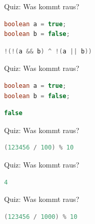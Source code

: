 \documentclass[18pt]{beamer}
\begin{document}
\begin{frame}[fragile]{Quiz: Was kommt raus?}
    \begin{lstlisting}[language=Java]
boolean a = true;
boolean b = false;
    \end{lstlisting}
    \begin{exampleblock}{}
        \begin{lstlisting}[language=Java]
!(!(a && b) ^ !(a || b))
        \end{lstlisting}
    \end{exampleblock}
\end{frame}

\begin{frame}[fragile]{Quiz: Was kommt raus?}
    \begin{lstlisting}[language=Java]
boolean a = true;
boolean b = false;
    \end{lstlisting}
    \begin{block}{}
        \begin{lstlisting}[language=Java]
false
        \end{lstlisting}
    \end{block}
\end{frame}

\begin{frame}[fragile]{Quiz: Was kommt raus?}
    \begin{exampleblock}{}
        \begin{lstlisting}[language=Java]
(123456 / 100) % 10
        \end{lstlisting}
    \end{exampleblock}
\end{frame}

\begin{frame}[fragile]{Quiz: Was kommt raus?}
    \begin{block}{}
        \begin{lstlisting}[language=Java]
4
        \end{lstlisting}
    \end{block}
\end{frame}

\begin{frame}[fragile]{Quiz: Was kommt raus?}
    \begin{exampleblock}{}
        \begin{lstlisting}[language=Java]
(123456 / 1000) % 10
        \end{lstlisting}
    \end{exampleblock}
\end{frame}
\end{document}
